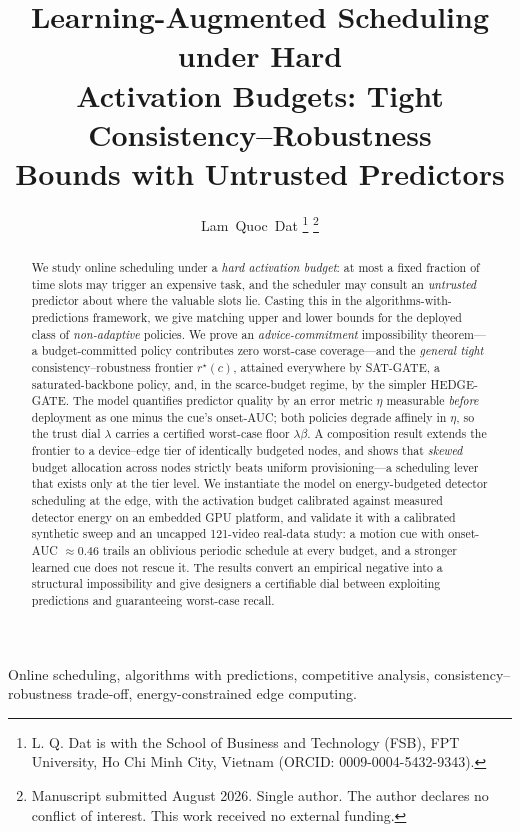 ﻿\documentclass[lettersize,journal]{IEEEtran}
\begin{document}
\title{Learning-Augmented Scheduling under Hard\\ Activation Budgets: Tight Consistency--Robustness\\ Bounds with Untrusted Predictors}
\author{Lam~Quoc~Dat%
\thanks{L. Q. Dat is with the School of Business and Technology (FSB), FPT University, Ho Chi Minh City, Vietnam (ORCID: 0009-0004-5432-9343).}%
\thanks{Manuscript submitted August 2026. Single author. The author declares no conflict of interest. This work received no external funding.}}
\markboth{}{}
\maketitle
\begin{abstract}
We study online scheduling under a \emph{hard activation budget}: at most a fixed fraction of time slots may trigger an expensive task, and the scheduler may consult an \emph{untrusted} predictor about where the valuable slots lie. Casting this in the algorithms-with-predictions framework, we give matching upper and lower bounds for the deployed class of \emph{non-adaptive} policies. We prove an \emph{advice-commitment} impossibility theorem---a budget-committed policy contributes zero worst-case coverage---and the \emph{general tight} consistency--robustness frontier $r^\star(c)$, attained everywhere by SAT-GATE, a saturated-backbone policy, and, in the scarce-budget regime, by the simpler HEDGE-GATE. The model quantifies predictor quality by an error metric $\eta$ measurable \emph{before} deployment as one minus the cue's onset-AUC; both policies degrade affinely in $\eta$, so the trust dial $\lambda$ carries a certified worst-case floor $\lambda\beta$. A composition result extends the frontier to a device--edge tier of identically budgeted nodes, and shows that \emph{skewed} budget allocation across nodes strictly beats uniform provisioning---a scheduling lever that exists only at the tier level. We instantiate the model on energy-budgeted detector scheduling at the edge, with the activation budget calibrated against measured detector energy on an embedded GPU platform, and validate it with a calibrated synthetic sweep and an uncapped 121-video real-data study: a motion cue with onset-AUC $\approx 0.46$ trails an oblivious periodic schedule at every budget, and a stronger learned cue does not rescue it. The results convert an empirical negative into a structural impossibility and give designers a certifiable dial between exploiting predictions and guaranteeing worst-case recall.
\end{abstract}
\begin{IEEEkeywords}
Online scheduling, algorithms with predictions, competitive analysis, consistency--robustness trade-off, energy-constrained edge computing.
\end{IEEEkeywords}
\IEEEpeerreviewmaketitle
\end{document}
